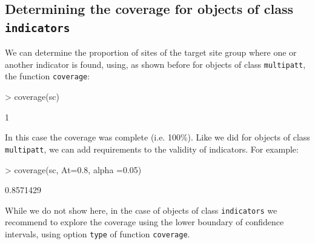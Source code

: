 \documentclass[11pt,a4paper]{article}
\begin{document}
\subsection{Determining the coverage for objects of class \texttt{indicators}}
We can determine the proportion of sites of the target site group where one or another indicator is found, using, as shown before for objects of class \texttt{multipatt}, the function \texttt{coverage}:
\begin{Schunk}
\begin{Sinput}
> coverage(sc)
\end{Sinput}
\begin{Soutput}
[1] 1
\end{Soutput}
\end{Schunk}
In this case the coverage was complete (i.e. 100\%). Like we did for objects of class \texttt{multipatt}, we can add requirements to the validity of indicators. For example:
\begin{Schunk}
\begin{Sinput}
> coverage(sc, At=0.8, alpha =0.05)
\end{Sinput}
\begin{Soutput}
[1] 0.8571429
\end{Soutput}
\end{Schunk}
While we do not show here, in the case of objects of class \texttt{indicators} we recommend to explore the coverage using the lower boundary of confidence intervals, using option \texttt{type} of function \texttt{coverage}. 
\end{document}
